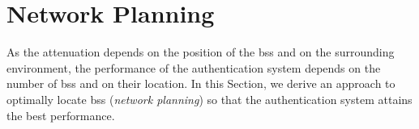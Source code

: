 \documentclass[conference,final]{IEEEtran}
\begin{document}



\section{Network Planning}\label{sec:bsPos}

As the attenuation depends on the position of the \acp{bs} and on the surrounding environment, the performance of the authentication system depends on the number of \acp{bs} and on their location. In this Section, we derive an approach to optimally locate \acp{bs} (\emph{network planning}) so that the authentication system attains the best performance. 
\end{document}
